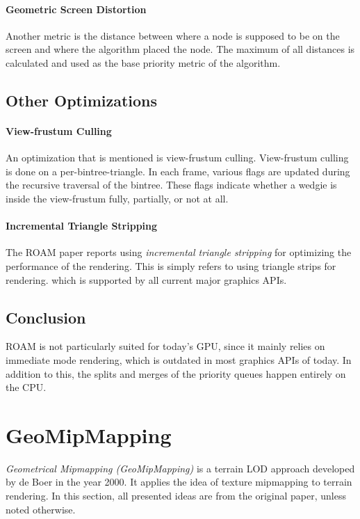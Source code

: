 \paragraph{Geometric Screen Distortion}
Another metric is the distance between where a node is supposed to be on the screen and where the algorithm placed the node.
The maximum of all distances is calculated and used as the base priority metric of the algorithm.

\subsection{Other Optimizations}
\paragraph{View-frustum Culling}
An optimization that is mentioned is view-frustum culling. 
View-frustum culling is done on a per-bintree-triangle.
In each frame, various flags are updated during 
the recursive traversal of the bintree. These flags indicate whether a wedgie is inside the view-frustum 
fully, partially, or not at all.

\paragraph{Incremental Triangle Stripping}
The ROAM paper reports using \textit{incremental triangle stripping} for optimizing the performance of the rendering.
This is simply refers to using triangle strips for rendering. which is supported by all current major graphics APIs.

\subsection{Conclusion}
ROAM is not particularly suited for today's GPU, since it mainly relies 
on immediate mode rendering, which is outdated in most graphics APIs of today.
In addition to this, the splits and merges of the priority queues happen entirely on the CPU.


\section{GeoMipMapping}
\textit{Geometrical Mipmapping (GeoMipMapping)} is a terrain LOD approach developed by de Boer \cite{geomipmapping} in the year 2000. 
It applies the idea of texture mipmapping to terrain rendering. In this section, all 
presented ideas are from the original paper, unless noted otherwise.

